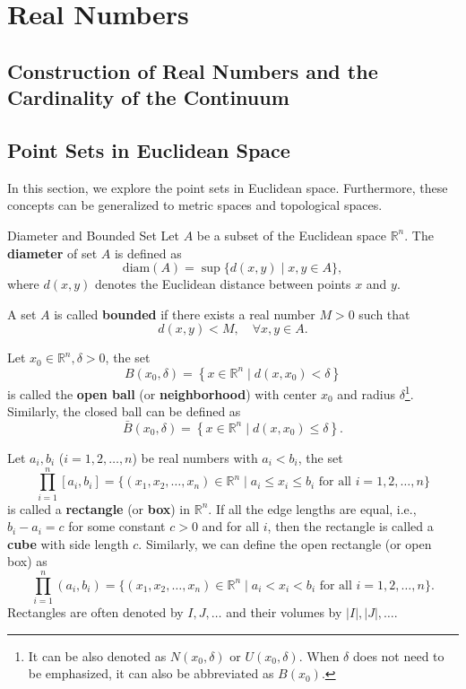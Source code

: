 \chapter{Real Numbers} %
\section{Construction of Real Numbers and the Cardinality of the Continuum} %

\section{Point Sets in Euclidean Space} %
In this section, we explore the point sets in Euclidean space.
Furthermore, these concepts can be generalized to metric spaces and topological spaces.

\begin{definition}{Diameter and Bounded Set} %
    Let \(A\) be a subset of the Euclidean space \(\mathbb{R}^n\). 
    The \textbf{diameter} of set \(A\) is defined as
    \[
        \mathrm{diam}(A) = \sup \{d(x, y) \mid x, y \in A\},
    \]
    where \(d(x, y)\) denotes the Euclidean distance between points \(x\) and \(y\).
    
    A set \(A\) is called \textbf{bounded} if there exists a real number \(M > 0\) such that
    \[
        d(x, y) < M, \quad \forall x, y \in A.
    \]
    
    Let \(x_{0}\in \mathbb{R}^{n}, \delta>0\), the set
    \[
        B\left(x_{0}, \delta\right)=\left\{x \in \mathbb{R}^{n} \mid d\left(x, x_{0}\right)<\delta\right\}
    \]
    is called the \textbf{open ball} (or \textbf{neighborhood}) with center \(x_{0}\) and radius \(\delta\)\footnote{
        It can be also denoted as \(N(x_0, \delta)\) or \(U(x_0, \delta)\).
        When \(\delta\) does not need to be emphasized, it can also be abbreviated as \(B(x_0)\).
    }.
    Similarly, the closed ball can be defined as
    \[
        \bar{B}\left(x_{0}, \delta\right)=\left\{x \in \mathbb{R}^{n} \mid d\left(x, x_{0}\right) \leq \delta\right\}.
    \]

    Let \(a_{i},b_{i}\) (\(i=1,2,\ldots,n\)) be real numbers with \(a_{i} < b_{i}\), the set
    \[
        \prod_{i=1}^n [a_i, b_i] = \{(x_1, x_2, \ldots, x_n) \in 
        \mathbb{R}^n \mid a_i \leq x_i \leq b_i \text{ for all } i=1,2,\ldots,n \}
    \]
    is called a \textbf{rectangle} (or \textbf{box}) in \(\mathbb{R}^n\).
    If all the edge lengths are equal, i.e., \(b_i - a_i = c\) for some constant \(c > 0\) and for all \(i\), 
    then the rectangle is called a \textbf{cube} with side length \(c\).
    Similarly, we can define the open rectangle (or open box) as
    \[
        \prod_{i=1}^n (a_i, b_i) = \{(x_1, x_2, \ldots, x_n) \in 
        \mathbb{R}^n \mid a_i < x_i < b_i \text{ for all } i=1,2,\ldots,n \}.
    \]
    Rectangles are often denoted by \(I, J, \ldots\) and their volumes by \(|I|, |J|, \ldots\).
\end{definition}

